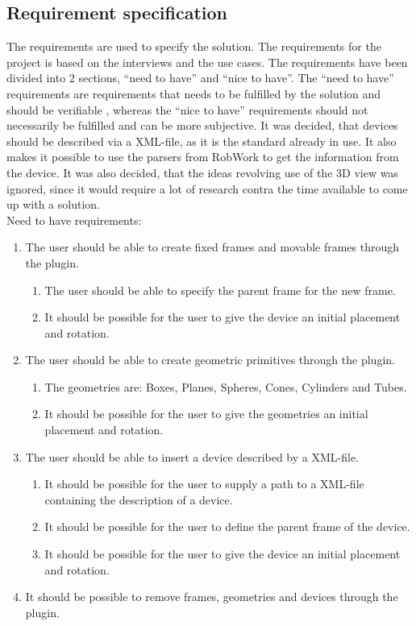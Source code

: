 \subsection{Requirement specification}
The requirements are used to specify the solution. The requirements for the project is based on the interviews and the use cases. The requirements have been divided into 2 sections, “need to have” and “nice to have”. The “need to have” requirements are requirements that needs to be fulfilled by the solution and should be verifiable , whereas the “nice to have” requirements should not necessarily be fulfilled and can be more subjective. It was decided, that devices should be described via a XML-file, as it is the standard already in use. It also makes it possible to use the parsers from RobWork to get the information from the device. It was also decided, that the ideas revolving use of the 3D view was ignored, since it would require a lot of research contra the time available to come up with a solution.\\

Need to have requirements:
\begin{enumerate}
	\item The user should be able to create fixed frames and movable frames through the plugin.
	\begin{enumerate}
		\item The user should be able to specify the parent frame for the new
		 frame.
		 \item It should be possible for the user to give the device an initial placement and rotation.
	\end{enumerate}
	\item The user should be able to create geometric primitives through the plugin.
	\begin{enumerate}
		\item The geometries are: Boxes, Planes, Spheres, Cones, Cylinders and Tubes.
		\item It should be possible for the user to give the geometries an initial placement and rotation.
	\end{enumerate}
	\item The user should be able to insert a device described by a XML-file.
	\begin{enumerate}
		\item It should be possible for the user to supply a path to a XML-file containing the description of a device.
		\item It should be possible for the user to define the parent frame of the device.
		\item It should be possible for the user to give the device an initial placement and rotation.
	\end{enumerate}
	\item It should be possible to remove frames, geometries and devices through the plugin.
\end{enumerate}

